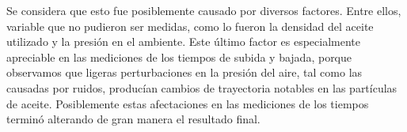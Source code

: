 \documentclass{article}
\begin{document}
\begin{multicols}{2}
Se considera que esto fue posiblemente causado por diversos factores. Entre ellos, variable que no pudieron ser medidas, como lo fueron la densidad del aceite utilizado y la presión en el ambiente. Este último factor es especialmente apreciable en las mediciones de los tiempos de subida y bajada, porque observamos que ligeras perturbaciones en la presión del aire, tal como las causadas por ruidos, producían cambios de trayectoria notables en las partículas de aceite.
Posiblemente estas afectaciones en las mediciones de los tiempos terminó alterando de gran manera el resultado final.



\end{multicols}
\end{document}

